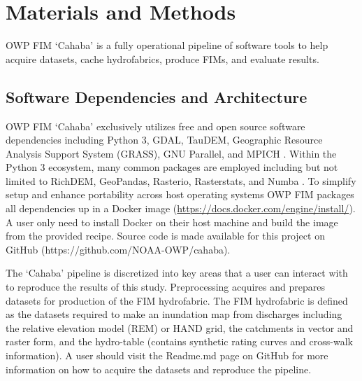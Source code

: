 
\section{Materials and Methods}
%
OWP FIM `Cahaba' is a fully operational pipeline of software tools to help acquire datasets, cache hydrofabrics, produce FIMs, and evaluate results.
%
\subsection{Software Dependencies and Architecture}
%
OWP FIM `Cahaba' exclusively utilizes free and open source software dependencies including Python 3, GDAL, TauDEM, Geographic Resource Analysis Support System (GRASS), GNU Parallel, and MPICH \cite{python382,gdal2020,tarboton2005terrain,grass2020,tange2015gnu,amer2021mpich}.
Within the Python 3 ecosystem, many common packages are employed including but not limited to RichDEM, GeoPandas, Rasterio, Rasterstats, and Numba \cite{barnes2018richdem,jordahl2014geopandas,lam2015numba}. 
To simplify setup and enhance portability across host operating systems OWP FIM packages all dependencies up in a Docker image (\url{https://docs.docker.com/engine/install/}). 
A user only need to install Docker on their host machine and build the image from the provided recipe. 
Source code is made available for this project on GitHub (https://github.com/NOAA-OWP/cahaba). 

The `Cahaba' pipeline is discretized into key areas that a user can interact with to reproduce the results of this study. 
Preprocessing acquires and prepares datasets for production of the FIM hydrofabric. 
The FIM hydrofabric is defined as the datasets required to make an inundation map from discharges including the relative elevation model (REM) or HAND grid, the catchments in vector and raster form, and the hydro-table (contains synthetic rating curves and cross-walk information).
A user should visit the Readme.md page on GitHub for more information on how to acquire the datasets and reproduce the pipeline.
%
